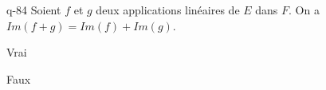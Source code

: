 \begin{truefalse}{q-84}
Soient $f$ et $g$ deux applications linéaires de $E$ dans $F$. On a $Im(f+g)=Im(f)+Im(g)$.
\item Vrai
\item* Faux
\end{truefalse}

